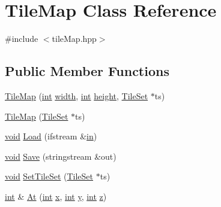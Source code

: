 \hypertarget{class_tile_map}{\section{Tile\-Map Class Reference}
\label{class_tile_map}
}


{\ttfamily \#include $<$tile\-Map.\-hpp$>$}

\subsection*{Public Member Functions}
\begin{DoxyCompactItemize}
\item 
\hyperlink{class_tile_map_a4a1d933285f515f3f331d71e46927587}{Tile\-Map} (\hyperlink{_s_d_l__thread_8h_a6a64f9be4433e4de6e2f2f548cf3c08e}{int} \hyperlink{_s_d_l__opengl_8h_a9a82cf3caff84cabc4598e2619faac17}{width}, \hyperlink{_s_d_l__thread_8h_a6a64f9be4433e4de6e2f2f548cf3c08e}{int} \hyperlink{_s_d_l__opengl_8h_aa352f2804b9902ac30769c00dde75d5f}{height}, \hyperlink{class_tile_set}{Tile\-Set} $\ast$ts)
\item 
\hyperlink{class_tile_map_a1db7c1bc62ef555d4b9263f1492c343d}{Tile\-Map} (\hyperlink{class_tile_set}{Tile\-Set} $\ast$ts)
\item 
\hyperlink{_s_d_l__opengles2__gl2ext_8h_ae5d8fa23ad07c48bb609509eae494c95}{void} \hyperlink{class_tile_map_a53545d8e01b300f63850fe636eecb39b}{Load} (ifstream \&\hyperlink{_s_d_l__opengl__glext_8h_a83ad0ee7f1e06b59c90271716e689080}{in})
\item 
\hyperlink{_s_d_l__opengles2__gl2ext_8h_ae5d8fa23ad07c48bb609509eae494c95}{void} \hyperlink{class_tile_map_aad84b4e9a90e149b300b5d2dda331f96}{Save} (stringstream \&out)
\item 
\hyperlink{_s_d_l__opengles2__gl2ext_8h_ae5d8fa23ad07c48bb609509eae494c95}{void} \hyperlink{class_tile_map_ad8abf89eb0e05b788495db9605943a8d}{Set\-Tile\-Set} (\hyperlink{class_tile_set}{Tile\-Set} $\ast$ts)
\item 
\hyperlink{_s_d_l__thread_8h_a6a64f9be4433e4de6e2f2f548cf3c08e}{int} \& \hyperlink{class_tile_map_a21d8a4be721f6961dd06bb31607b7b42}{At} (\hyperlink{_s_d_l__thread_8h_a6a64f9be4433e4de6e2f2f548cf3c08e}{int} \hyperlink{_s_d_l__opengl_8h_ad0e63d0edcdbd3d79554076bf309fd47}{x}, \hyperlink{_s_d_l__thread_8h_a6a64f9be4433e4de6e2f2f548cf3c08e}{int} \hyperlink{_s_d_l__opengl_8h_a1675d9d7bb68e1657ff028643b4037e3}{y}, \hyperlink{_s_d_l__thread_8h_a6a64f9be4433e4de6e2f2f548cf3c08e}{int} \hyperlink{_s_d_l__opengl__glext_8h_a5e74030ebb3297ce1b37ff716fedd68f}{z})

\end{DoxyCompactItemize}
